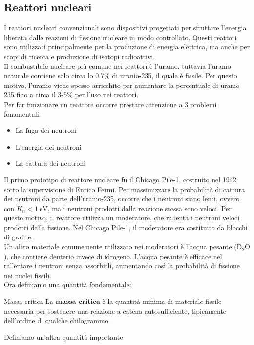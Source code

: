 \subsection{Reattori nucleari}
I reattori nucleari convenzionali sono dispositivi progettati per sfruttare l'energia liberata dalle reazioni di fissione nucleare in modo controllato. Questi reattori sono utilizzati principalmente per la produzione di energia elettrica, ma anche per scopi di ricerca e produzione di isotopi radioattivi.\\
Il combustibile nucleare più comune nei reattori è l'uranio, tuttavia l'uranio naturale contiene solo circa lo 0.7\% di uranio-235, il quale è fissile. Per questo motivo, l'uranio viene spesso arricchito per aumentare la percentuale di uranio-235 fino a circa il 3-5\% per l'uso nei reattori.\\
Per far funzionare un reattore occorre prestare attenzione a 3 problemi fonamentali:
\begin{itemize}
    \item La fuga dei neutroni
    \item L'energia dei neutroni
    \item La cattura dei neutroni
\end{itemize}
Il primo prototipo di reattore nucleare fu il Chicago Pile-1, costruito nel 1942 sotto la supervisione di Enrico Fermi. Per massimizzare la probabilità di cattura dei neutroni da parte dell'uranio-235, occorre che i neutroni siano lenti, ovvero con $K_n < \qty{1}{\electronvolt}$, ma i neutroni prodotti dalla reazione stessa sono veloci. Per questo motivo, il reattore utilizza un moderatore, che rallenta i neutroni veloci prodotti dalla fissione. Nel Chicago Pile-1, il moderatore era costituito da blocchi di grafite.\\
Un altro materiale comunemente utilizzato nei moderatori è l'acqua pesante ($\mathrm{D_2O}$), che contiene deuterio invece di idrogeno. L'acqua pesante è efficace nel rallentare i neutroni senza assorbirli, aumentando così la probabilità di fissione nei nuclei fissili.\\
Ora definiamo una quantità fondamentale:
\begin{definition}{Massa critica}
    La \textbf{massa critica} è la quantità minima di materiale fissile necessaria per sostenere una reazione a catena autosufficiente, tipicamente dell'ordine di qualche chilogrammo.
\end{definition}
Definiamo un'altra quantità importante:
